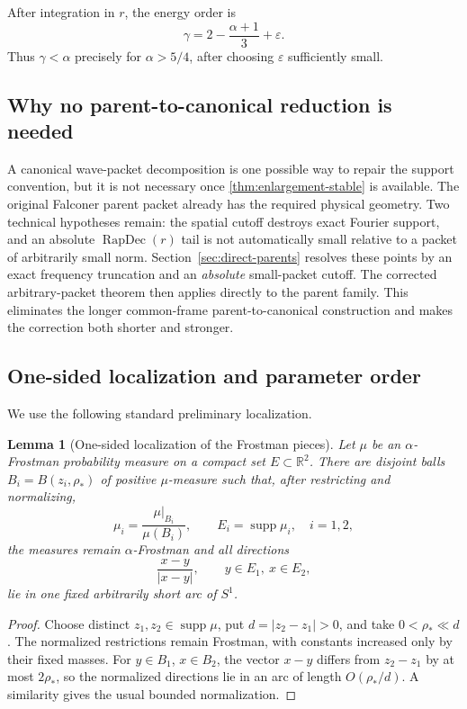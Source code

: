 \documentclass[11pt,letterpaper]{amsart}
\newtheorem{lemma}[lemma]{Lemma}
\newcommand{\R}{\mathbb{R}}
\newcommand{\supp}{\operatorname{supp}}
\newcommand{\RapDec}{\operatorname{RapDec}}
\newcommand{\eps}{\varepsilon}
\newcommand{\abs}[1]{\lvert#1\rvert}
\begin{document}
After integration in \(r\), the energy order is
\[
 \gamma=2-\frac{\alpha+1}{3}+\eps.
\]
Thus \(\gamma<\alpha\) precisely for \(\alpha>5/4\), after choosing
\(\eps\) sufficiently small.

\subsection*{Why no parent-to-canonical reduction is needed}

A canonical wave-packet decomposition is one possible way to repair the
support convention, but it is not necessary once
\cref{thm:enlargement-stable} is available.  The original Falconer parent
packet already has the required physical geometry.  Two technical
hypotheses remain: the spatial cutoff destroys exact Fourier support, and
an absolute \(\RapDec(r)\) tail is not automatically small relative to a
packet of arbitrarily small norm.  Section~\ref{sec:direct-parents} resolves
these points by an exact frequency truncation and an \emph{absolute}
small-packet cutoff.  The corrected arbitrary-packet theorem then applies
directly to the parent family.  This eliminates the longer common-frame
parent-to-canonical construction and makes the correction both shorter and
stronger.

\subsection*{One-sided localization and parameter order}

We use the following standard preliminary localization.

\begin{lemma}[One-sided localization of the Frostman pieces]
\label{lem:one-sided-localization}
Let \(\mu\) be an \(\alpha\)-Frostman probability measure on a compact set
\(E\subset\R^2\).  There are disjoint balls
\(B_i=B(z_i,\rho_*)\) of positive \(\mu\)-measure such that, after restricting
and normalizing,
\[
 \mu_i=\frac{\mu|_{B_i}}{\mu(B_i)},\qquad
 E_i=\supp\mu_i,\quad i=1,2,
\]
the measures remain \(\alpha\)-Frostman and all directions
\[
 \frac{x-y}{\abs{x-y}},\qquad y\in E_1,\ x\in E_2,
\]
lie in one fixed arbitrarily short arc of \(S^1\).
\end{lemma}

\begin{proof}
Choose distinct \(z_1,z_2\in\supp\mu\), put
\(d=\abs{z_2-z_1}>0\), and take \(0<\rho_*\ll d\).  The normalized
restrictions remain Frostman, with constants increased only by their fixed
masses.  For \(y\in B_1\), \(x\in B_2\), the vector \(x-y\) differs from
\(z_2-z_1\) by at most \(2\rho_*\), so the normalized directions lie in an
arc of length \(O(\rho_*/d)\).  A similarity gives the usual bounded
normalization.
\end{proof}
\end{document}
